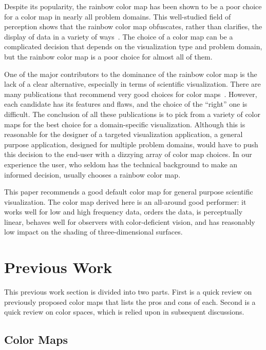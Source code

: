 \documentclass{llncs}
\newcommand{\lcite}[1]{~\cite{#1}}
\begin{document}
Despite its popularity, the rainbow color map has been shown to be a poor
choice for a color map in nearly all problem domains.  This well-studied
field of perception shows that the rainbow color map obfuscates, rather
than clarifies, the display of data in a variety of ways\lcite{Borland07}.
The choice of a color map can be a complicated decision that depends on the
visualization type and problem domain, but the rainbow color map is a poor
choice for almost all of them.

One of the major contributors to the dominance of the rainbow color map is the
lack of a clear alternative, especially in terms of scientific
visualization.  There are many publications that recommend
very good choices for color maps\lcite{Brewer05,Levkowitz92,Rheingans99,Ware04}.
However, each candidate has its features and flaws, and the choice of
the ``right'' one is difficult.  The conclusion of
all these publications is to pick from a variety of color maps for the best
choice for a domain-specific visualization.  Although this is reasonable
for the designer of a targeted visualization application, a general
purpose application, designed for multiple problem domains, would have to
push this decision to the end-user with a dizzying array of color map
choices.  In our experience the user, who seldom has the technical
background to make an informed decision, usually chooses a rainbow color map.

This paper recommends a good default
color map for general purpose scientific visualization.  The
color map derived here is an all-around good performer: it works well for
low and high frequency data, orders the data, is perceptually linear,
behaves well for observers with color-deficient vision, and has reasonably
low impact on the shading of three-dimensional surfaces.


\section{Previous Work}
\label{sec:PreviousWork}

This previous work section is divided into two parts.  First is a
quick review on previously proposed color maps that lists the pros and
cons of each.  Second is a quick review on color spaces,
which is relied upon in subsequent discussions.

\subsection{Color Maps}
\label{sec:PreviousWork:ColorMaps}
\end{document}
